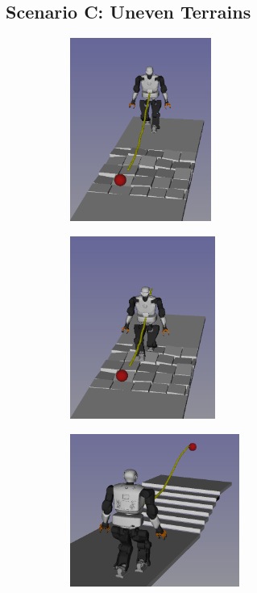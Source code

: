 \subsection{Scenario C: Uneven Terrains}
\begin{figure}[H]
    \captionsetup[subfigure]{justification=centering}
    \centering
    \begin{subfigure}[t]{0.4\linewidth}
        \includegraphics[width=\textwidth, height=6cm]{Figures/Chapter_CPSB/rubbles_0.png}
    \end{subfigure}
    \begin{subfigure}[t]{0.4\linewidth}
        \includegraphics[width=\textwidth, height=6cm]{Figures/Chapter_CPSB/rubbles_1.png}
    \end{subfigure}
    \begin{subfigure}[t]{0.4\linewidth}
        \includegraphics[width=\textwidth, height=5cm]{Figures/Chapter_CPSB/stairs_diago.png}

\end{subfigure}
\end{figure}
